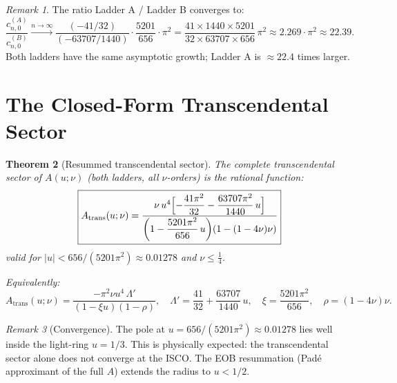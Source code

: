 \documentclass[11pt,a4paper]{article}
\theoremstyle{plain}
\newtheorem{theorem}{Theorem}[section]
\theoremstyle{definition}
\theoremstyle{remark}
\newtheorem{remark}[theorem]{Remark}
\newcommand{\cA}{c^{(A)}}
\newcommand{\cB}{c^{(B)}}
\begin{document}
\begin{remark}
The ratio Ladder A / Ladder B converges to:
\begin{equation}
  \frac{\cA_{n,0}}{\cB_{n,0}} \xrightarrow{n\to\infty}
  \frac{(-41/32)}{(-63707/1440)} \cdot \frac{5201}{656} \cdot \pi^2
  = \frac{41\times1440\times5201}{32\times63707\times656}\,\pi^2
  \approx 2.269\cdot\pi^2 \approx 22.39.
  \label{eq:AB_ratio}
\end{equation}
Both ladders have the same asymptotic growth; Ladder A is $\approx 22.4$ times larger.
\end{remark}

\section{The Closed-Form Transcendental Sector}
\label{sec:closed}

\begin{theorem}[Resummed transcendental sector]\label{thm:resum}
The complete transcendental sector of $A(u;\nu)$ (both ladders, all $\nu$-orders)
is the rational function:
\begin{equation}
  \boxed{A_{\mathrm{trans}}(u;\nu)
    = \frac{\nu\,u^4\Bigl[-\dfrac{41\pi^2}{32}
      - \dfrac{63707\pi^2}{1440}\,u\Bigr]}
      {\displaystyle\left(1 - \frac{5201\pi^2}{656}\,u\right)\!\left(1-(1-4\nu)\nu\right)}}
  \label{eq:Atrans}
\end{equation}
valid for $|u| < 656/(5201\pi^2) \approx 0.01278$ and $\nu\leq\tfrac{1}{4}$.

Equivalently:
\begin{equation}
  A_{\mathrm{trans}}(u;\nu)
  = \frac{-\pi^2\nu u^4\,\Lambda'}{(1 - \xi u)(1 - \rho)},
  \quad
  \Lambda' = \frac{41}{32} + \frac{63707}{1440}\,u,
  \quad
  \xi = \frac{5201\pi^2}{656},
  \quad
  \rho = (1-4\nu)\nu.
  \label{eq:Atrans2}
\end{equation}
\end{theorem}

\begin{remark}[Convergence]
The pole at $u = 656/(5201\pi^2) \approx 0.01278$ lies well inside the light-ring
$u = 1/3$. This is physically expected: the transcendental sector alone does not
converge at the ISCO.  The EOB resummation (Pad\'e approximant of the full $A$)
extends the radius to $u < 1/2$.
\end{remark}
\end{document}

